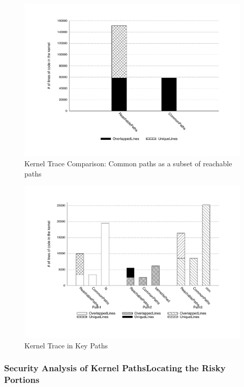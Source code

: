 \begin{figure}
\centering
\includegraphics[width=1.0\columnwidth]{diagram/lind_oakland16_diagram_01.pdf}
\caption{Kernel Trace Comparison: Common paths as a subset of reachable
paths}
\label{fig:subset}
\end{figure}

\begin{figure}
\centering
\includegraphics[width=1.0\columnwidth]{diagram/lind_oakland16_diagram_02.pdf}
\caption{Kernel Trace in Key Paths}
\label{fig:key_paths_trace}
\end{figure}

\subsubsection{Security Analysis of Kernel Paths\textendash Locating the
Risky Portions}

